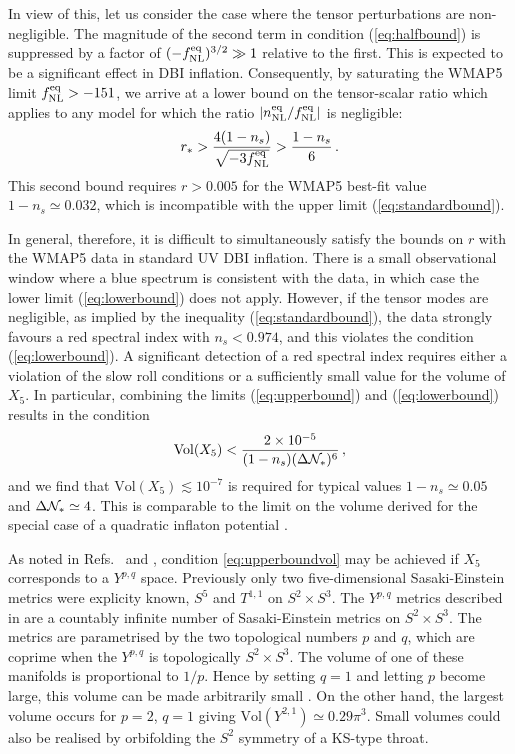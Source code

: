 In view of this, let us consider the case where the tensor 
perturbations are non-negligible. 
The magnitude of the second term in condition (\ref{eq:halfbound}) 
is suppressed by a factor of $(-f_{\mathrm{NL}}^{\mathrm{eq}})^{3/2} \gg 1$ 
relative to the first. This is expected to 
be a significant effect in DBI inflation. 
Consequently, 
by saturating the WMAP5 limit $f_{\mathrm{NL}}^{\mathrm{eq}} > -151$, we arrive at 
a lower bound on the tensor-scalar ratio which applies   
to any model for which the ratio $|n_{\mathrm{NL}}^{\mathrm{eq}}/f_{\mathrm{NL}}^{\mathrm{eq}}|$ is 
negligible:
% 
\begin{equation}
\label{eq:lowerbound}
r_* >  \frac{4(1-n_s)}{\sqrt{-3f_{\mathrm{NL}}^{\mathrm{eq}}}} > \frac{1-n_s}{6} \,.
\end{equation}
% 
This second bound requires $r > 0.005$ for the WMAP5 best-fit value 
$1-n_s \simeq 0.032$, which is incompatible with the upper limit 
(\ref{eq:standardbound}). 


In general, therefore, it is difficult to simultaneously satisfy 
the bounds on $r$ with the WMAP5 data
in standard UV DBI inflation. There is a 
small observational window where a blue spectrum is consistent 
with the data, in which case the lower limit 
(\ref{eq:lowerbound}) does not apply. 
However, if the tensor modes are negligible,
as implied by the inequality (\ref{eq:standardbound}), the 
data strongly favours a red spectral index with $n_s < 0.974$,
and this violates the condition (\ref{eq:lowerbound}). A significant 
detection of a red spectral index requires either a 
violation of the slow roll conditions or a sufficiently 
small value for the volume of $X_5$. 
In particular, combining the limits
(\ref{eq:upperbound}) and (\ref{eq:lowerbound}) results in the condition 
% 
\begin{equation}
\label{eq:upperboundvol}
\mathrm{Vol}(X_5) < \frac{2 \times 10^{-5}}{(1-n_s) 
(\Delta \mathcal{N}_{*} )^6}  \,,
\end{equation}
% 
and we find that $\mathrm{Vol}(X_5) \lesssim 10^{-7}$ 
is required for typical values $1-n_s \simeq 0.05$ and 
$\Delta \mathcal{N}_* \simeq 4$. 
This 
is comparable to the limit on the volume derived for the special case of a 
quadratic inflaton potential \cite{bmpaper}.  

As noted in Refs.~\cite{bmpaper} and \cite{bean}, condition 
\eqref{eq:upperboundvol} may be achieved 
if $X_5$ corresponds to a $Y^{p,q}$ space. Previously only two five-dimensional Sasaki-Einstein
metrics were explicity known, $S^5$ and $T^{1,1}$ on $S^2\times S^3$. The $Y^{p,q}$ metrics
described in  are a countably infinite number of Sasaki-Einstein metrics on
$S^2\times S^3$. The metrics are parametrised by the two topological numbers $p$ and $q$, which are
coprime when the $Y^{p,q}$ is topologically $S^2\times S^3$. The volume of one of these manifolds
is proportional to $1/p$. Hence by setting $q=1$ and letting $p$ become large, this volume can be
made arbitrarily small \cite{gauntlett}. On the other hand, the largest volume occurs for $p=2$,
$q=1$ giving $\mathrm{Vol}(Y^{2,1})\simeq 0.29\pi^3$. 
% 
Small volumes could also be realised 
by orbifolding the $S^2$ symmetry of a KS-type throat. 


